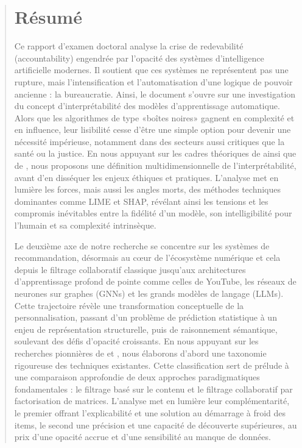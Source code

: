 \onecolumn
\small
\begin{quote}

\section*{Résumé}
\setlength{\parindent}{1.5em}
Ce rapport d'examen doctoral analyse la crise de redevabilité (accountability)  engendrée par l'opacité des systèmes d'intelligence artificielle modernes. Il soutient que ces systèmes ne représentent pas une rupture, mais l'intensification et l'automatisation d'une logique de pouvoir ancienne : la bureaucratie. Ainsi, le document s'ouvre sur une investigation du concept d'interprétabilité des modèles d'apprentissage automatique. Alors que les algorithmes de type «boîtes noires» gagnent en complexité et en influence, leur lisibilité cesse d'être une simple option pour devenir une nécessité impérieuse, notamment dans des secteurs aussi critiques que la santé ou la justice. En nous appuyant sur les cadres théoriques de \citet{Doran2017} ainsi que de \citet{Burkart2021}, nous proposons une définition multidimensionnelle de l'interprétabilité, avant d'en disséquer les enjeux éthiques et pratiques. L'analyse met en lumière les forces, mais aussi les angles morts, des méthodes techniques dominantes comme LIME et SHAP, révélant ainsi les tensions et les compromis inévitables entre la fidélité d'un modèle, son intelligibilité pour l'humain et sa complexité intrinsèque. 

Le deuxième axe de notre recherche se concentre sur les systèmes de recommandation, désormais au cœur de l'écosystème numérique et cela depuis le filtrage collaboratif classique jusqu'aux architectures d'apprentissage profond de pointe comme celles de YouTube, les réseaux de neurones sur graphes (GNNs) et les grands modèles de langage (LLMs). Cette trajectoire révèle une transformation conceptuelle de la personnalisation, passant d'un problème de prédiction statistique à un enjeu de représentation structurelle, puis de raisonnement sémantique, soulevant des défis d'opacité croissants. En nous appuyant sur les recherches pionnières de \citet{Ko2022} et \citet{Koren2011}, nous élaborons d'abord une taxonomie rigoureuse des techniques existantes. Cette classification sert de prélude à une comparaison approfondie de deux approches paradigmatiques fondamentales : le filtrage basé sur le contenu \citet{Pariser2011} et le filtrage collaboratif par factorisation de matrices. \citet{Koren2009} L'analyse met en lumière leur complémentarité, le premier offrant l'explicabilité et une solution au démarrage à froid des items, le second une précision et une capacité de découverte supérieures, au prix d'une opacité accrue et d'une sensibilité au manque de données. 


\end{quote}
